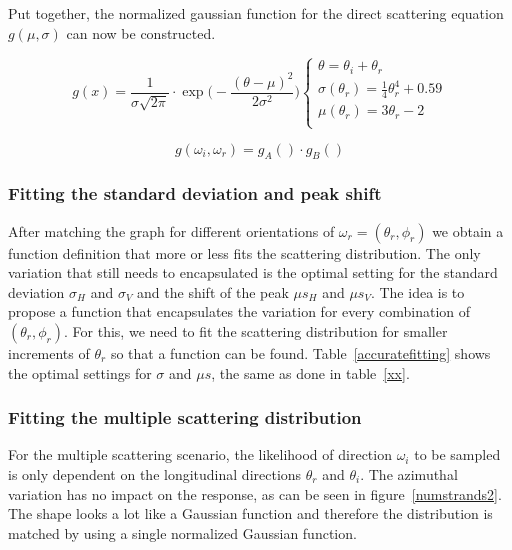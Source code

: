 \documentclass[11pt,a4paper]{report}
\begin{document}
Put together, the normalized gaussian function for the direct scattering equation $g(\mu, \sigma)$ can now be constructed.


\begin{equation}
g(x) = \frac{1}{\sigma \sqrt{2\pi}} \cdot \exp \Bigg(-\frac{(\theta - \mu)^2}{2\sigma^2} \Bigg) 
\begin{cases}
\theta = \theta_i + \theta_r \\
\sigma(\theta_r) = \frac{1}{4} \theta_r^4 + 0.59 \\
\mu(\theta_r) = 3\theta_r - 2 \\
\end{cases}
\end{equation}



\begin{equation}
g(\omega_i, \omega_r) = g_A() \cdot g_B()
\end{equation}




\subsubsection{Fitting the standard deviation and peak shift}

After matching the graph for different orientations of $\omega_r = (\theta_r, \phi_r)$ we obtain a function definition that more or less fits the scattering distribution. The only variation that still needs to encapsulated is the optimal setting for the standard deviation $\sigma_H$ and $\sigma_V$ and the shift of the peak $\mu s_H$ and $\mu s_V$. The idea is to propose a function that encapsulates the variation for every combination of $(\theta_r, \phi_r)$. For this, we need to fit the scattering distribution for smaller increments of $\theta_r$ so that a function can be found. Table~\ref{accuratefitting} shows the optimal settings for $\sigma$ and $\mu s$, the same as done in table~\ref{xx}.



\subsubsection{Fitting the multiple scattering distribution}


For the multiple scattering scenario, the likelihood of direction $\omega_i$ to be sampled is only dependent on the longitudinal directions $\theta_r$ and $\theta_i$. The azimuthal variation has no impact on the response, as can be seen in figure~\ref{numstrands2}. The shape looks a lot like a Gaussian function and therefore the distribution is matched by using a single normalized Gaussian function.
\end{document}
